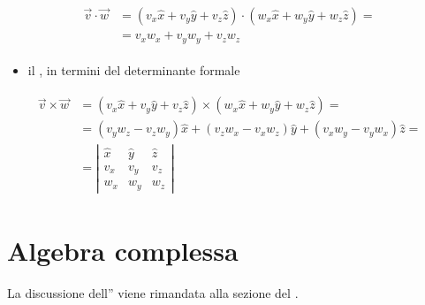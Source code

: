\documentclass[letterpaper,10pt,italian]{jupyterBook}
\begin{document}
\begin{equation*}
\begin{split}\begin{aligned}
    \vec{v} \cdot \vec{w}
    & = (v_x \hat{x} + v_y \hat{y} + v_z \hat{z}) \cdot (w_x \hat{x} + w_y \hat{y} + w_z \hat{z}) = \\
    & = v_x w_x + v_y w_y + v_z w_z
  \end{aligned}\end{split}
\end{equation*}\begin{itemize}
\item {} 
\sphinxAtStartPar
il , in termini del determinante formale

\end{itemize}
\begin{equation*}
\begin{split}\begin{aligned}
    \vec{v} \times \vec{w}
    & = (v_x \hat{x} + v_y \hat{y} + v_z \hat{z}) \times (w_x \hat{x} + w_y \hat{y} + w_z \hat{z}) = \\
    & = (v_y w_z - v_z w_y) \hat{x} + (v_z w_x - v_x w_z) \hat{y} + (v_x w_y - v_y w_x) \hat{z} = \\
    & = \left| \begin{matrix} \hat{x} & \hat{y} & \hat{z} \\ v_x & v_y & v_z \\ w_x & w_y & w_z  \end{matrix} \right|
  \end{aligned}\end{split}
\end{equation*}
\sphinxstepscope




\chapter{Algebra complessa}
\label{\detokenize{ch/algebra/complex-algebra-link:algebra-complessa}}\label{\detokenize{ch/algebra/complex-algebra-link:math-hs-algebra-complex-link}}\label{\detokenize{ch/algebra/complex-algebra-link::doc}}
\sphinxAtStartPar
La discussione dell”{\hyperref[\detokenize{ch/algebra/complex-algebra:math-hs-algebra-complex}]{}} viene rimandata alla sezione del {\hyperref[\detokenize{ch/precalculus:math-hs-precalculus}]{}}.
\end{document}
